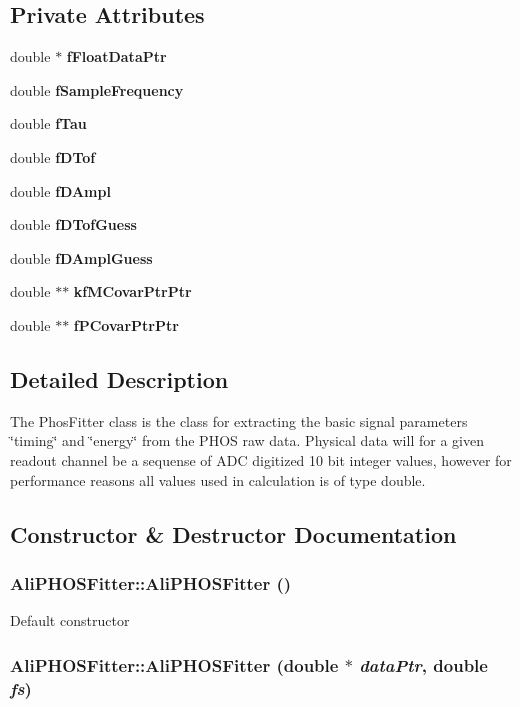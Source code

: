 \subsection*{Private Attributes}
\begin{CompactItemize}
\item 
double $\ast$ {\bf f\-Float\-Data\-Ptr}
\item 
double {\bf f\-Sample\-Frequency}
\item 
double {\bf f\-Tau}
\item 
double {\bf f\-DTof}
\item 
double {\bf f\-DAmpl}
\item 
double {\bf f\-DTof\-Guess}
\item 
double {\bf f\-DAmpl\-Guess}
\item 
double $\ast$$\ast$ {\bf kf\-MCovar\-Ptr\-Ptr}
\item 
double $\ast$$\ast$ {\bf f\-PCovar\-Ptr\-Ptr}
\end{CompactItemize}


\subsection{Detailed Description}
The Phos\-Fitter class is the class for extracting the basic signal parameters \char`\"{}timing\char`\"{} and \char`\"{}energy\char`\"{} from the PHOS raw data. Physical data will for a given readout channel be a sequense of ADC digitized 10 bit integer values, however for performance reasons all values used in calculation is of type double. 



\subsection{Constructor \& Destructor Documentation}
\subsubsection{\setlength{\rightskip}{0pt plus 5cm}Ali\-PHOSFitter::Ali\-PHOSFitter ()}\label{classAliPHOSFitter_a0}


Default constructor 
\subsubsection{\setlength{\rightskip}{0pt plus 5cm}Ali\-PHOSFitter::Ali\-PHOSFitter (double $\ast$ {\em data\-Ptr}, double {\em fs})}\label{classAliPHOSFitter_a1}


